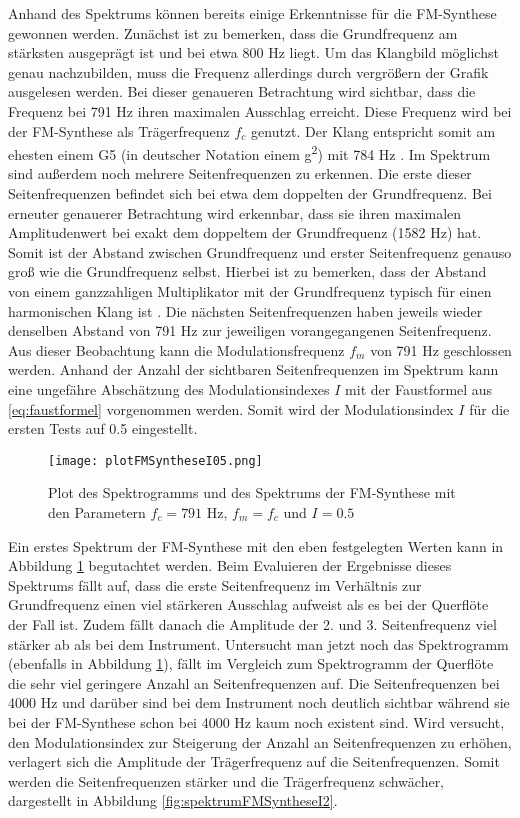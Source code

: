 Anhand des Spektrums können bereits einige Erkenntnisse für die FM-Synthese gewonnen werden. Zunächst ist zu bemerken, dass die Grundfrequenz am stärksten ausgeprägt ist und bei etwa 800 Hz liegt. Um das Klangbild möglichst genau nachzubilden, muss die Frequenz allerdings durch vergrößern der Grafik ausgelesen werden. Bei dieser genaueren Betrachtung wird sichtbar, dass die Frequenz bei 791 Hz ihren maximalen Ausschlag erreicht. Diese Frequenz wird bei der FM-Synthese als Trägerfrequenz $f_c$ genutzt. Der Klang entspricht somit am ehesten einem G5 (in deutscher Notation einem g\textsuperscript{2}) mit 784 Hz \cite[S. 181]{borucki}. Im Spektrum sind außerdem noch mehrere Seitenfrequenzen zu erkennen. Die erste dieser Seitenfrequenzen befindet sich bei etwa dem doppelten der Grundfrequenz. Bei erneuter genauerer Betrachtung wird erkennbar, dass sie ihren maximalen Amplitudenwert bei exakt dem doppeltem der Grundfrequenz (1582 Hz) hat. Somit ist der Abstand zwischen Grundfrequenz und erster Seitenfrequenz genauso groß wie die Grundfrequenz selbst. Hierbei ist zu bemerken, dass der Abstand von einem ganzzahligen Multiplikator mit der Grundfrequenz typisch für einen harmonischen Klang ist \cite[S. 528]{chowningPaper}. Die nächsten Seitenfrequenzen haben jeweils wieder denselben Abstand von 791 Hz zur jeweiligen vorangegangenen Seitenfrequenz. Aus dieser Beobachtung kann die Modulationsfrequenz $f_m$ von 791 Hz geschlossen werden. Anhand der Anzahl der sichtbaren Seitenfrequenzen im Spektrum kann eine ungefähre Abschätzung des Modulationsindexes $I$ mit der Faustformel aus \ref{eq:faustformel} vorgenommen werden. Somit wird der Modulationsindex $I$ für die ersten Tests auf 0.5 eingestellt. 

\begin{figure} [ht]
\centering
  \texttt{[image: plotFMSyntheseI05.png]}
\caption{Plot des Spektrogramms und des Spektrums der FM-Synthese mit den Parametern $f_c = 791$ Hz, $f_m = f_c$ und $I = 0.5$ }
\label{fig:plotFMSyntheseI05}
\end{figure}

Ein erstes Spektrum der FM-Synthese mit den eben festgelegten Werten kann in Abbildung \ref{fig:plotFMSyntheseI05} begutachtet werden. Beim Evaluieren der Ergebnisse dieses Spektrums fällt auf, dass die erste Seitenfrequenz im Verhältnis zur Grundfrequenz einen viel stärkeren Ausschlag aufweist als es bei der Querflöte der Fall ist. Zudem fällt danach die Amplitude der 2. und 3. Seitenfrequenz viel stärker ab als bei dem Instrument. Untersucht man jetzt noch das Spektrogramm (ebenfalls in Abbildung \ref{fig:plotFMSyntheseI05}), fällt im Vergleich zum Spektrogramm der Querflöte die sehr viel geringere Anzahl an Seitenfrequenzen auf. Die Seitenfrequenzen bei 4000 Hz und darüber sind bei dem Instrument noch deutlich sichtbar während sie bei der FM-Synthese schon bei 4000 Hz kaum noch existent sind. Wird versucht, den Modulationsindex zur Steigerung der Anzahl an Seitenfrequenzen zu erhöhen, verlagert sich die Amplitude der Trägerfrequenz auf die Seitenfrequenzen. Somit werden die Seitenfrequenzen stärker und die Trägerfrequenz schwächer, dargestellt in Abbildung \ref{fig:spektrumFMSyntheseI2}. 

